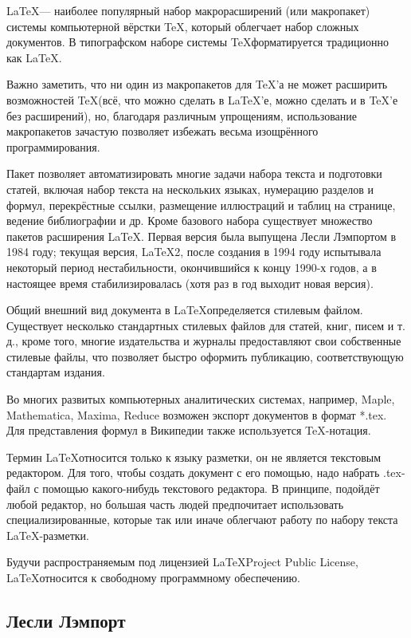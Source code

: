 \documentclass[a4paper,12pt]{article} %
\begin{document}
\LaTeX  — наиболее популярный набор макрорасширений (или макропакет) системы компьютерной вёрстки \TeX, который облегчает набор сложных документов. В типографском наборе системы \TeX форматируется традиционно как \LaTeX.

Важно заметить, что ни один из макропакетов для \TeX’а не может расширить возможностей \TeX (всё, что можно сделать в \LaTeX’е, можно сделать и в \TeX’е без расширений), но, благодаря различным упрощениям, использование макропакетов зачастую позволяет избежать весьма изощрённого программирования.

Пакет позволяет автоматизировать многие задачи набора текста и подготовки статей, включая набор текста на нескольких языках, нумерацию разделов и формул, перекрёстные ссылки, размещение иллюстраций и таблиц на странице, ведение библиографии и др. Кроме базового набора существует множество пакетов расширения \LaTeX. Первая версия была выпущена Лесли Лэмпортом в 1984 году; текущая версия, \LaTeX2, после создания в 1994 году испытывала некоторый период нестабильности, окончившийся к концу 1990-х годов, а в настоящее время стабилизировалась (хотя раз в год выходит новая версия).

Общий внешний вид документа в \LaTeX определяется стилевым файлом. Существует несколько стандартных стилевых файлов для статей, книг, писем и т. д., кроме того, многие издательства и журналы предоставляют свои собственные стилевые файлы, что позволяет быстро оформить публикацию, соответствующую стандартам издания.

Во многих развитых компьютерных аналитических системах, например, Maple, Mathematica, Maxima, Reduce возможен экспорт документов в формат *.tex. Для представления формул в Википедии также используется \TeX-нотация.

Термин \LaTeX относится только к языку разметки, он не является текстовым редактором. Для того, чтобы создать документ с его помощью, надо набрать .tex-файл с помощью какого-нибудь текстового редактора. В принципе, подойдёт любой редактор, но большая часть людей предпочитает использовать специализированные, которые так или иначе облегчают работу по набору текста LaTeX-разметки.

Будучи распространяемым под лицензией \LaTeX Project Public License, \LaTeX относится к свободному программному обеспечению.

\subsection*{Лесли Лэмпорт}
\end{document}
